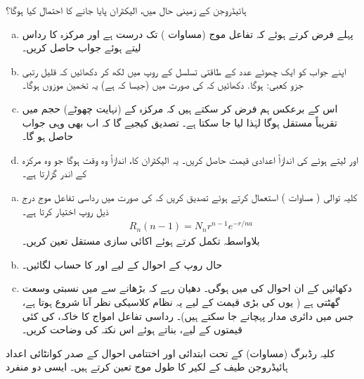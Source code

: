 ہائیڈروجن کے زمینی حال میں، الیکٹران پایا جانے کا احتمال کیا ہوگا؟ 
\begin{enumerate}[a.]
\item
پہلے فرض کرتے ہوئے کہ تفاعل موج (مساوات )  تک درست ہے اور مرکزہ کا رداس  لیتے ہوئے  جواب حاصل کریں۔ 
\item
اپنے جواب کو ایک چھوٹے عدد  کے طاقتی تسلسل کے روپ میں لکھ کر دکھائیں کہ قلیل  رتبی جزو کعبی:  ہوگا. دکھائیں کہ  کی صورت میں (جیسا کہ ہے) یہ تخمین موزوں ہوگا۔
 \item
اس کے برعکس ہم فرض کر سکتے ہیں کہ مرکزہ کے (نہایت چھوٹے) حجم میں  تقریباً مستقل ہوگا لہٰذا  لیا جا سکتا ہے۔ تصدیق کیجیے گا کہ اب بھی وہی جواب حاصل ہو گا۔
\item
{} اور  لیتے ہوئے  کی اندازاً اعدادی قیمت حاصل کریں۔ یہ الیکٹران کا، اندازاً وہ وقت ہوگا جو وہ مرکزہ کے اندر گزارتا ہے۔ 
\end{enumerate}
\begin{enumerate}[a.]
\item
کلیہ توالی ( مساوات ) استعمال کرتے ہوئے تصدیق کریں کہ  کی صورت میں رداسی تفاعل موج درج ذیل روپ اختیار کرتا ہے۔ 
\begin{align*}
R_n (n - 1) = N_n r^{n - 1} e^{-r/na}
\end{align*}
بلاواسطہ تکمل کرتے ہوئے  اکائی سازی  مستقل  تعین کریں۔
\item
حال  روپ کے احوال کے لیے  اور  کا حساب لگائیں۔
\item
دکھائیں کے ان احوال کی  میں   ہوگی۔ دھیان رہے کہ  بڑھانے سے  میں نسبتی وسعت گھٹتی ہے ( یوں  کی بڑی قیمت کے لیے یہ نظام کلاسیکی نظر آنا شروع ہوتا ہے، جس میں دائری مدار پہچانے جا سکتے ہیں)۔ رداسی تفاعل امواج کا خاکہ،  کی کئی قیمتوں کے لیے، بناتے ہوئے اس نکتہ کی وضاحت کریں۔
\end{enumerate}
\quad
 کلیہ رڈبرگ (مساوات) کے تحت ابتدائی اور اختتامی احوال کے صدر کوانٹائی اعداد ہائیڈروجن طیف کے لکیر کا طول موج تعین کرتے ہیں۔ ایسی دو منفرد
